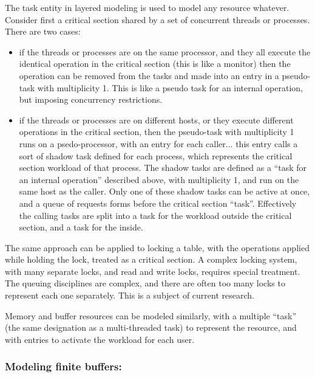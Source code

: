 \documentclass[11pt]{article}
\begin{document}
The task entity in layered modeling is used to model any resource whatever. Consider first a
critical section shared by a set of concurrent threads or processes. There are two cases:
\begin{itemize}
\item if the threads or processes are on the same processor, and they all execute the identical operation
  in the critical section (this is like a monitor) then the operation can be removed from the tasks
  and made into an entry in a pseudo-task with multiplicity 1. This is like a pseudo task for an
  internal operation, but imposing concurrency restrictions.
\item if the threads or processes are on different hosts, or they execute different operations in the
  critical section, then the pseudo-task with multiplicity 1 runs on a psedo-processor, with an
  entry for each caller... this entry calls a sort of shadow task defined for each process, which
  represents the critical section workload of that process. The shadow tasks are defined as a ``task
  for an internal operation'' described above, with multiplicity 1, and run on the same host as the
  caller. Only one of these shadow tasks can be active at once, and a queue of requests forms
  before the critical section ``task''. Effectively the calling tasks are split into a task for the
  workload outside the critical section, and a task for the inside.
\end{itemize}
The same approach can be applied to locking a table, with the operations applied while
holding the lock, treated as a critical section. A complex locking system, with many separate locks,
and read and write locks, requires special treatment. The queuing disciplines are complex, and there
are often too many locks to represent each one separately. This is a subject of current research.

Memory and buffer resources can be modeled similarly, with a multiple ``task'' (the same
designation as a multi-threaded task) to represent the resource, and with entries to activate the
workload for each user.

\subsubsection{Modeling finite buffers:}
\label{sec:finite-buffers}
\end{document}
